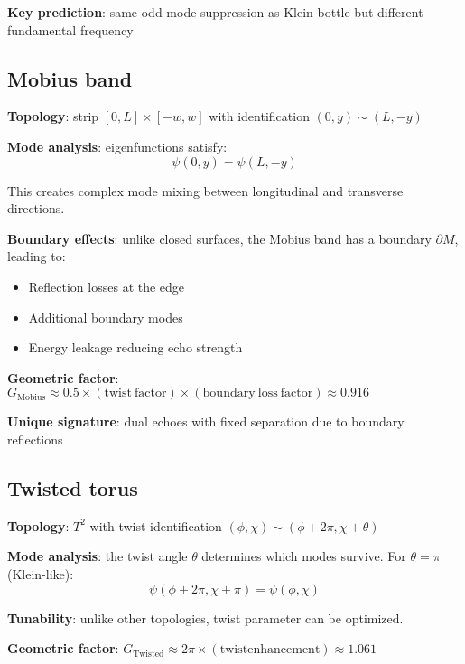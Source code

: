 \documentclass[12pt]{iopart}
\begin{document}
\textbf{Key prediction}: same odd-mode suppression as Klein bottle but different fundamental frequency

\subsection{Mobius band}

\textbf{Topology}: strip $[0,L] \times [-w,w]$ with identification $(0,y) \sim (L,-y)$

\textbf{Mode analysis}: eigenfunctions satisfy:
\begin{equation}
\psi(0,y) = \psi(L,-y)
\end{equation}

This creates complex mode mixing between longitudinal and transverse directions.

\textbf{Boundary effects}: unlike closed surfaces, the Mobius band has a boundary $\partial M$, leading to:
\begin{itemize}
\item Reflection losses at the edge
\item Additional boundary modes
\item Energy leakage reducing echo strength
\end{itemize}

\textbf{Geometric factor}: $G_{\mathrm{Mobius}} \approx 0.5 \times \mathrm{(twist\ factor)} \times \mathrm{(boundary\ loss\ factor)} \approx 0.916$

\textbf{Unique signature}: dual echoes with fixed separation due to boundary reflections

\subsection{Twisted torus}

\textbf{Topology}: $T^2$ with twist identification $(\phi, \chi) \sim (\phi + 2\pi, \chi + \theta)$

\textbf{Mode analysis}: the twist angle $\theta$ determines which modes survive. For $\theta = \pi$ (Klein-like):
\begin{equation}
\psi(\phi + 2\pi, \chi + \pi) = \psi(\phi, \chi)
\end{equation}

\textbf{Tunability}: unlike other topologies, twist parameter can be optimized.

\textbf{Geometric factor}: $G_{\mathrm{Twisted}} \approx 2\pi \times \mathrm{(twist enhancement)} \approx 1.061$
\end{document}
